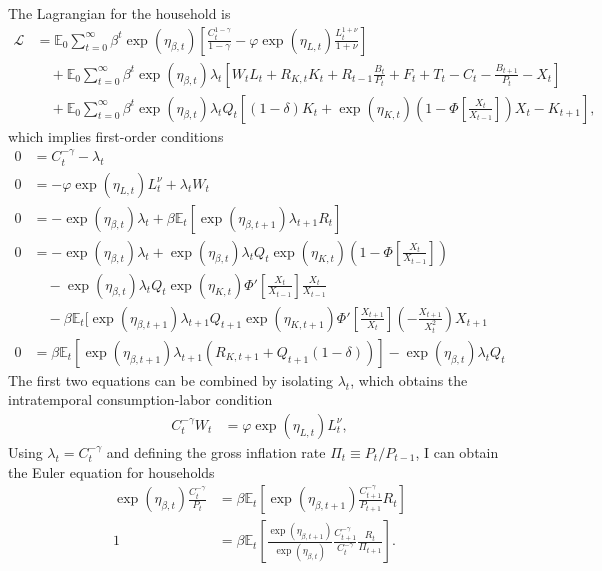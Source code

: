 \documentclass[12 pt, oneside]{article}
\theoremstyle{definition}
\theoremstyle{definition}
\theoremstyle{definition}
\newcommand{\E}{\mathbb{E}}
\newcommand{\calL}{\mathcal{L}}
\begin{document}
The Lagrangian for the household is
\begin{align*}
\calL & = \E_0 \sum_{t = 0}^\infty \beta^t\exp(\eta_{\beta, t})\left[\frac{C_t^{1 - \gamma}}{1 - \gamma} - \varphi\exp(\eta_{L, t}) \frac{L_t^{1 + \nu}}{1 + \nu}\right]\\
        &\quad + \E_0 \sum_{t = 0}^\infty \beta^t\exp(\eta_{\beta, t})\lambda_t\left[ W_{t} L_t + R_{K, t} K_t + R_{t - 1}\frac{B_t}{P_t} + F_t + T_t - C_t -\frac{ B_{t + 1}}{P_t} - X_t\right]\\
        &\quad + \E_0 \sum_{t = 0}^\infty \beta^t\exp(\eta_{\beta, t})\lambda_t Q_t\left[(1 - \delta)K_t +\exp( \eta_{K, t})\left(1 - \Phi\left[\frac{X_t}{X_{t - 1}}\right]\right)X_t - K_{t + 1}\right],
\end{align*}
which implies first-order conditions
\begin{align*}
  0 & = C_t^{- \gamma} - \lambda_t\\
  0 & = -\varphi\exp(\eta_{L, t}) L_t^\nu + \lambda_t W_{t}\\
  0 & = -\exp(\eta_{\beta, t})\lambda_t + \beta \E_t[\exp(\eta_{\beta, t + 1})\lambda_{t + 1}R_t]\\
  0 & = -\exp(\eta_{\beta, t})\lambda_t + \exp(\eta_{\beta, t})\lambda_tQ_t \exp(\eta_{K, t})\left(1 - \Phi\left[\frac{X_t}{X_{t - 1}}\right]\right)\\
    &\quad - \exp(\eta_{\beta, t})\lambda_tQ_t\exp(\eta_{K, t})\Phi'\left[\frac{X_t}{X_{t - 1}}\right]\frac{X_t}{X_{t - 1}}\\
    &\quad  - \beta\E_t[\exp(\eta_{\beta, t + 1})\lambda_{t + 1}Q_{t + 1}\exp(\eta_{K, t + 1})\Phi'\left[\frac{X_{t + 1}}{X_t}\right]\left(-\frac{X_{t + 1}}{X_t^2}\right)X_{t + 1}\\
  0 & =  \beta\E_t[\exp(\eta_{\beta, t + 1}) \lambda_{t + 1} (R_{K, t + 1} + Q_{t + 1}(1 - \delta))] - \exp(\eta_{\beta, t})\lambda_{t} Q_{t}
\end{align*}
The first two equations can be combined by isolating $\lambda_t$, which obtains the intratemporal consumption-labor condition
\begin{align*}
    C_t^{-\gamma} W_t & = \varphi\exp(\eta_{L, t}) L_t^\nu,
\end{align*}
Using $\lambda_t = C_t^{-\gamma}$ and defining the gross inflation rate $\Pi_t \equiv P_{t} / P_{t - 1}$, I can obtain the Euler equation for households
\begin{align*}
  \exp(\eta_{\beta, t})\frac{C_t^{-\gamma}}{P_t} & = \beta \E_t\left[\exp(\eta_{\beta, t + 1})\frac{C_{t + 1}^{-\gamma}}{P_{t + 1}}R_t\right]\\
  1 & = \beta \E_t\left[\frac{\exp(\eta_{\beta, t + 1})}{ \exp(\eta_{\beta, t})}\frac{C_{t + 1}^{-\gamma}}{ C_t^{-\gamma}}\frac{R_t}{\Pi_{t + 1}}\right].
\end{align*}
\end{document}
